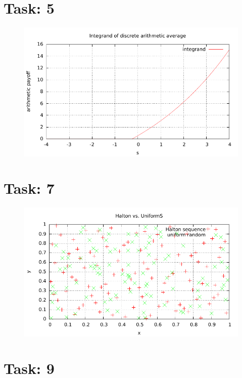 \documentclass{article}
\begin{document}
\section*{Task: 5}

\begin{figure}[htbp]
  \centering
     \includegraphics[width=1.0\textwidth]{../Task05/sh3_task5_arithmetic_payoff.pdf}
\end{figure}
\newpage
\section*{Task: 7}

\begin{figure}[htbp]
  \centering
     \includegraphics[width=1.0\textwidth]{../Task07/sh3_task7_point_plot.pdf}
\end{figure}

\section*{Task: 9}
\end{document}
